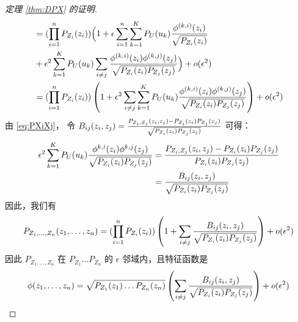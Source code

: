\begin{proof}[定理 \ref{thm:DPX} 的证明]
\begin{align*}
&= (\prod_{i=1}^n  P_{Z_i} (z_i))
\Big(1+\epsilon\sum_{i=1}^n \sum_{k=1}^{K} P_U(u_k){\phi^{(k,i)}(z_i) \over \sqrt{P_{Z_i}(z_i)}} \\
&+\epsilon^2 \sum_{k=1}^{K} P_U(u_k)\sum_{i\neq j}{\phi^{(k,i)}(z_i)\phi^{(k,j)}(z_j)\over \sqrt{P_{Z_i}(z_i)P_{Z_j}(z_j)} } 
\Big) + o(\epsilon^2)\\
&= (\prod_{i=1}^n  P_{Z_i} (z_i))
\left(1 +\epsilon^2\sum_{i\neq j} \sum_{k=1}^{K}P_U(u_k){\phi^{(k,i)}(z_i)\phi^{(k,j)}(z_j)\over \sqrt{P_{Z_i}(z_i)P_{Z_j}(z_j)} }\right) + o(\epsilon^2)
\end{align*}
由 \eqref{eq:PXiXj}，
令 $B_{ij}(z_i, z_j)={P_{Z_i, Z_j}(z_i,z_j) - P_{Z_i}(z_i)P_{Z_j}(z_j) \over \sqrt{P_{Z_i}(z_i)P_{Z_j}(z_j)}} $ 可得：
\begin{align}
\epsilon^2\sum_{k=1}^{K}P_U(u_k)
{\phi^{k,i}(z_i)\phi^{k,j}(z_j)\over \sqrt{P_{Z_i}(z_i)P_{Z_j}(z_j)} } & = {P_{Z_i, Z_j}(z_i, z_j) - P_{Z_i}(z_i)P_{Z_j}(z_j) \over P_{Z_i}(z_i)P_{Z_j}(z_j)} \notag\\
& = {B_{ij}(z_i, z_j) \over \sqrt{P_{Z_i}(z_i)P_{Z_j}(z_j)} } \label{eq:Bsecond}
\end{align}
因此，我们有
\begin{equation}\label{eq:sep}
P_{Z_1,\dots,Z_n}(z_1,\dots,z_n) =  (\prod_{i=1}^n  P_{Z_i} (z_i))\left( 1 + \sum_{i\neq j}{B_{ij}(z_i, z_j) \over \sqrt{P_{Z_i}(z_i)P_{Z_j}(z_j)} }\right) +o(\epsilon^2)
\end{equation}
因此 $P_{Z_1,\dots, Z_n}$ 在 $P_{Z_1}\dots P_{Z_n}$ 的
$\epsilon$ 邻域内，且特征函数是
$$\phi(z_1,\dots, z_n)=
\sqrt{P_{Z_1}(z_1)\dots P_{Z_n}(z_n)}
\left(\sum_{i\neq j}{B_{ij}(z_i, z_j) 
\over \sqrt{P_{Z_i}(z_i)P_{Z_j}(z_j)} }\right)
+o(\epsilon^2)$$


\end{proof}
